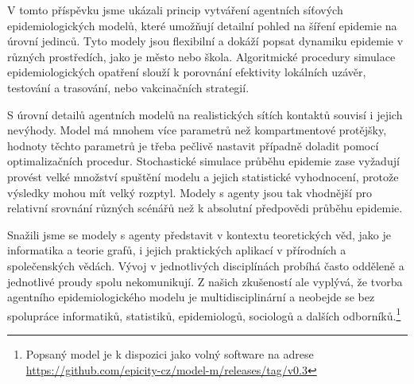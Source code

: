 V tomto příspěvku jsme ukázali princip vytváření agentních síťových epidemiologických modelů, které umožňují detailní pohled na šíření epidemie na úrovní jedinců. Tyto modely jsou flexibilní a dokáží popsat dynamiku  epidemie v různých prostředích, jako je město nebo škola. Algoritmické procedury simulace epidemiologických opatření slouží k porovnání efektivity lokálních uzávěr, testování a trasování, nebo vakcinačních strategií. 

S úrovní detailů agentních modelů na realistických sítích kontaktů souvisí i jejich nevýhody. Model má mnohem více parametrů než kompartmentové protějšky, hodnoty těchto parametrů je třeba pečlivě nastavit případně doladit pomocí optimalizačních procedur. Stochastické simulace průběhu epidemie zase vyžadují provést velké množství spuštění modelu a jejich statistické vyhodnocení, protože výsledky mohou mít velký rozptyl. Modely s agenty jsou tak vhodnější pro relativní srovnání různých scénářů než k absolutní předpovědi průběhu epidemie. 

Snažili jsme se modely s agenty představit v kontextu teoretických věd, jako je informatika a teorie grafů, i jejich praktických aplikací v přírodních a společenských vědách. Vývoj v jednotlivých disciplínách probíhá často odděleně a jednotlivé proudy spolu nekomunikují. Z našich zkušeností ale vyplývá, že tvorba agentního epidemiologického modelu je multidisciplinární a neobejde se bez spolupráce informatiků, statistiků, epidemiologů, sociologů a dalších odborníků.\footnote{Popsaný model je k dispozici jako volný software na adrese \url{https://github.com/epicity-cz/model-m/releases/tag/v0.3}} 
